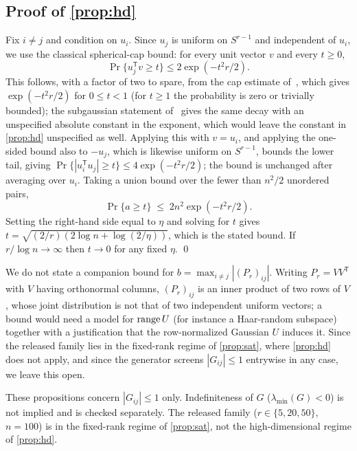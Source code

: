 \subsection{Proof of \cref{prop:hd}}
Fix $i\ne j$ and condition on $u_i$. Since $u_j$ is uniform on $S^{r-1}$ and
independent of $u_i$, we use the classical spherical-cap bound: for every
unit vector $v$ and every $t\ge0$,
\[
  \Pr\bigl\{u_j^{\mathsf T}v\ge t\bigr\}\le 2\exp(-t^2r/2).
\]
This follows, with a factor of two to spare, from the cap estimate
of~\cite[Lem.~2.2]{ball1997elementary}, which gives $\exp(-t^2r/2)$ for
$0\le t<1$ (for $t\ge1$ the probability is zero or trivially bounded);
the subgaussian statement of~\cite[Thm.~3.4.5]{vershynin2026high} gives the
same decay with an unspecified absolute constant in the exponent, which would
leave the constant in \cref{prop:hd} unspecified as well.
Applying this with $v=u_i$, and applying the one-sided bound also to $-u_j$,
which is likewise uniform on $S^{r-1}$, bounds the lower tail, giving
$\Pr\{|u_i^{\mathsf T}u_j|\ge t\}\le4\exp(-t^2r/2)$; the bound is unchanged
after averaging over $u_i$. Taking a union bound over the fewer than $n^2/2$
unordered pairs,
\[
  \Pr\{a\ge t\}\;\le\;2n^2\exp(-t^2r/2).
\]
Setting the right-hand side equal to $\eta$ and solving for $t$ gives
$t=\sqrt{(2/r)(2\log n+\log(2/\eta))}$, which is the stated bound. If
$r/\log n\to\infty$ then $t\to0$ for any fixed $\eta$. \qed

\begin{remark}[On $b$]
We do not state a companion bound for $b=\max_{i\ne j}|(P_r)_{ij}|$. Writing
$P_r=VV^{\mathsf T}$ with $V$ having orthonormal columns, $(P_r)_{ij}$ is an
inner product of two rows of $V$, whose joint distribution is not that of two
independent uniform vectors; a bound would need a model for $\operatorname{range} U$ (for
instance a Haar-random subspace) together with a justification that the
row-normalized Gaussian $U$ induces it. Since the released family lies in the
fixed-rank regime of \cref{prop:sat}, where \cref{prop:hd} does not apply, and
since the generator screens $|G_{ij}|\le1$ entrywise in any case, we leave
this open.
\end{remark}

\begin{remark}[Scope]
These propositions concern $|G_{ij}|\le1$ only. Indefiniteness of $G$
($\lambda_{\min}(G)<0$) is not implied and is checked separately. The
released family ($r\in\{5,20,50\}$, $n=100$) is in the fixed-rank regime of
\cref{prop:sat}, not the high-dimensional regime of \cref{prop:hd}.
\end{remark}


